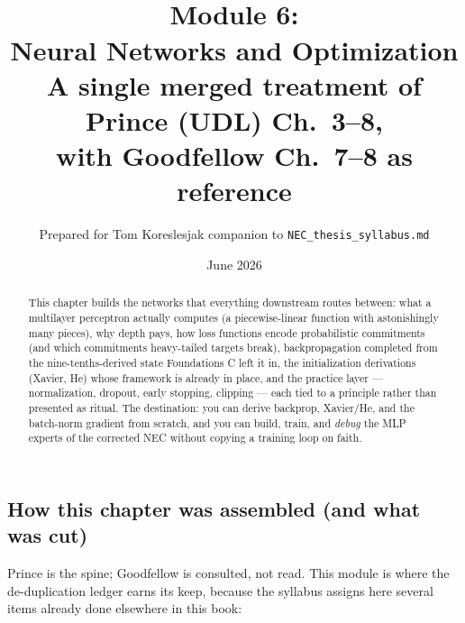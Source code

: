 \documentclass[11pt]{article}
\title{\vspace{-1.2em}{\large\sffamily Foundations for a Quant Research Pipeline}\\[0.4em]
\textbf{Module 6:\\ Neural Networks and Optimization}\\[0.3em]
{\large A single merged treatment of Prince (UDL) Ch.\ 3--8,\\ with Goodfellow Ch.\ 7--8 as reference}}
\author{Prepared for Tom Koreslesjak \;\textperiodcentered\; companion to \texttt{NEC\_thesis\_syllabus.md}}
\date{June 2026}
\numberwithin{equation}{section}
\theoremstyle{plain}
\theoremstyle{definition}
\theoremstyle{remark}
\begin{document}
\maketitle
\vspace{-1.5em}

\begin{abstract}
\noindent This chapter builds the networks that everything downstream routes between: what a multilayer perceptron actually computes (a piecewise-linear function with astonishingly many pieces), why depth pays, how loss functions encode probabilistic commitments (and which commitments heavy-tailed targets break), backpropagation completed from the nine-tenths-derived state Foundations C left it in, the initialization derivations (Xavier, He) whose framework is already in place, and the practice layer --- normalization, dropout, early stopping, clipping --- each tied to a principle rather than presented as ritual. The destination: you can derive backprop, Xavier/He, and the batch-norm gradient from scratch, and you can build, train, and \emph{debug} the MLP experts of the corrected NEC without copying a training loop on faith.
\end{abstract}

\tableofcontents

\subsection*{How this chapter was assembled (and what was cut)}

Prince is the spine; Goodfellow is consulted, not read. This module is where the de-duplication ledger earns its keep, because the syllabus assigns here several items already done elsewhere in this book:
\end{document}
